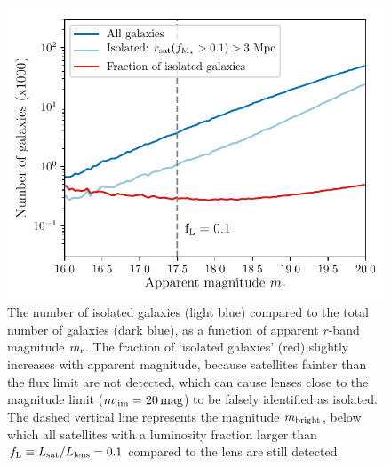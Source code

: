 \documentclass[usenatbib]{mnras}
\newcommand{\magn}{\, {\rm mag} }
\newcommand{\un}[1]{_{\rm #1}}
\begin{document}
\begin{figure}
	\includegraphics[width=1.0\columnwidth]{Figures/isolation_test_kids_perc0p1-3Mpc.pdf}
	\caption{The number of isolated galaxies (light blue) compared to the total number of galaxies (dark blue), as a function of apparent $r$-band magnitude $m\un{r}$. The fraction of `isolated galaxies' (red) slightly increases with apparent magnitude, because satellites fainter than the flux limit are not detected, which can cause lenses close to the magnitude limit ($m\un{lim}=20 \magn$) to be falsely identified as isolated. The dashed vertical line represents the magnitude $m\un{bright}$, below which all satellites with a luminosity fraction larger than $f\un{L} \equiv L\un{sat}/L\un{lens}=0.1$ compared to the lens are still detected.}
	\label{fig:isolation_test_fraction}
\end{figure}
\end{document}
